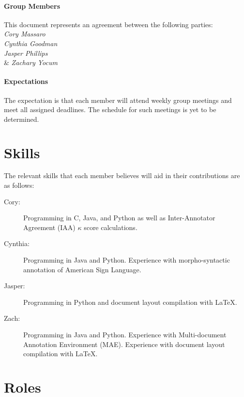 \documentclass{article}
\begin{document}
\paragraph{Group Members} %
\label{par:group_members}
\begin{center}
    This document represents an agreement between the following parties:\\
    \emph{Cory Massaro}\\
    \emph{Cynthia Goodman}\\
    \emph{Jasper Phillips}\\
    \& \emph{Zachary Yocum}    
\end{center}

\paragraph{Expectations} %
\label{par:expectations}
The expectation is that each member will attend weekly group meetings and meet all assigned deadlines. The schedule for such meetings is yet to be determined.

\section{Skills} %
\label{sec:skills}

The relevant skills that each member believes will aid in their contributions are as follows:

\begin{description}
    \item[Cory:] Programming in C, Java, and Python as well as Inter-Annotator Agreement (IAA) $\kappa$ score calculations.
    \item[Cynthia:] Programming in Java and Python. Experience with morpho-syntactic annotation of American Sign Language.
    \item [Jasper:] Programming in Python and document layout compilation with \LaTeX.
    \item[Zach:] Programming in Java and Python. Experience with Multi-document Annotation Environment (MAE). Experience with document layout compilation with \LaTeX.
\end{description}

\section{Roles} %
\label{sec:roles}
\end{document}

